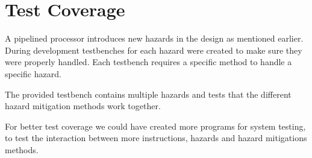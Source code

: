 \section{Test Coverage}
A pipelined processor introduces new hazards in the design as mentioned earlier.
During development testbenches for each hazard were created to make sure they were properly handled.
Each testbench requires a specific method to handle a specific hazard.

The provided testbench contains multiple hazards and tests that the different hazard mitigation methods work together.

For better test coverage we could have created more programs for system testing,
to test the interaction between more instructions, hazards and hazard mitigations methods.
